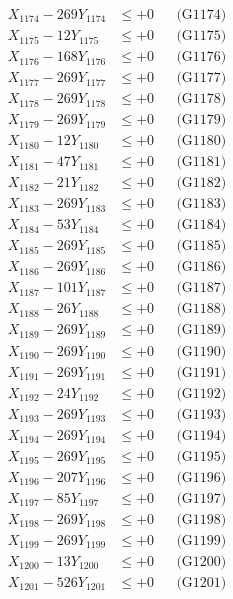 \documentclass[a4paper,10pt]{article}
\begin{document}
{\begin{align}
X_{1174} - 269Y_{1174} &\leq +0 && \text{(G1174)} \\
X_{1175} - 12Y_{1175} &\leq +0 && \text{(G1175)} \\
X_{1176} - 168Y_{1176} &\leq +0 && \text{(G1176)} \\
X_{1177} - 269Y_{1177} &\leq +0 && \text{(G1177)} \\
X_{1178} - 269Y_{1178} &\leq +0 && \text{(G1178)} \\
X_{1179} - 269Y_{1179} &\leq +0 && \text{(G1179)} \\
X_{1180} - 12Y_{1180} &\leq +0 && \text{(G1180)} \\
\allowbreak
X_{1181} - 47Y_{1181} &\leq +0 && \text{(G1181)} \\
X_{1182} - 21Y_{1182} &\leq +0 && \text{(G1182)} \\
X_{1183} - 269Y_{1183} &\leq +0 && \text{(G1183)} \\
X_{1184} - 53Y_{1184} &\leq +0 && \text{(G1184)} \\
X_{1185} - 269Y_{1185} &\leq +0 && \text{(G1185)} \\
X_{1186} - 269Y_{1186} &\leq +0 && \text{(G1186)} \\
X_{1187} - 101Y_{1187} &\leq +0 && \text{(G1187)} \\
X_{1188} - 26Y_{1188} &\leq +0 && \text{(G1188)} \\
X_{1189} - 269Y_{1189} &\leq +0 && \text{(G1189)} \\
X_{1190} - 269Y_{1190} &\leq +0 && \text{(G1190)} \\
\allowbreak
X_{1191} - 269Y_{1191} &\leq +0 && \text{(G1191)} \\
X_{1192} - 24Y_{1192} &\leq +0 && \text{(G1192)} \\
X_{1193} - 269Y_{1193} &\leq +0 && \text{(G1193)} \\
X_{1194} - 269Y_{1194} &\leq +0 && \text{(G1194)} \\
X_{1195} - 269Y_{1195} &\leq +0 && \text{(G1195)} \\
X_{1196} - 207Y_{1196} &\leq +0 && \text{(G1196)} \\
X_{1197} - 85Y_{1197} &\leq +0 && \text{(G1197)} \\
X_{1198} - 269Y_{1198} &\leq +0 && \text{(G1198)} \\
X_{1199} - 269Y_{1199} &\leq +0 && \text{(G1199)} \\
X_{1200} - 13Y_{1200} &\leq +0 && \text{(G1200)} \\
\allowbreak
X_{1201} - 526Y_{1201} &\leq +0 && \text{(G1201)} \\

\end{align}}
\end{document}
